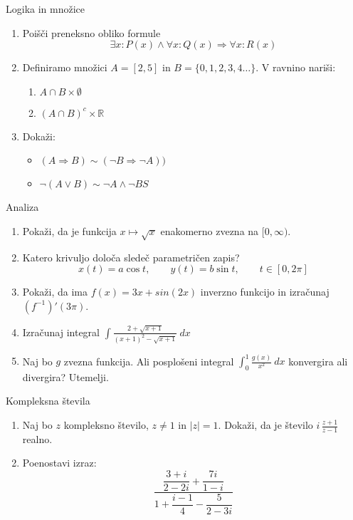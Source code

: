 \begin{frame}{Logika in množice}
	\begin{enumerate}
		\item
		Poišči preneksno obliko formule 
		$$\exists x : P(x) \wedge \forall x : Q(x) \Rightarrow \forall x : R(x)$$
		\item 
		Definiramo množici $A=[2,5]$ in $B=\{0,1,2,3,4\ldots\}$.
		V ravnino nariši:
		\begin{enumerate}
		   \item $A\cap B \times \emptyset$
		   \item $(A\cap B)^c \times \mathbb{R}$
		\end{enumerate}
		\item
		Dokaži:
		\begin{itemize}
			\item $(A\Rightarrow B)\sim(\neg B\Rightarrow \neg A))$
			\item $\neg(A \vee B)\sim \neg A \wedge \neg BS$
		\end{itemize}
	\end{enumerate}
\end{frame}

\begin{frame}{Analiza}
	\begin{enumerate}
		\item
		Pokaži, da je funkcija $x\mapsto \sqrt{x}$ enakomerno zvezna na $[0,\infty)$.
		\item 
		Katero krivuljo določa sledeč parametričen zapis?
		$$
		   x(t) = a \cos t, \qquad %
		   y(t) = b \sin t, \qquad %
		   t \in [0, 2 \pi]
		$$ 
		\item
		Pokaži, da ima $f(x)=3x + sin(2x)$ inverzno funkcijo 
		in izračunaj $(f^{-1})'(3\pi)$.
		
		\item
		Izračunaj integral 
		$\displaystyle \int\frac{2+\sqrt{x+1}}{(x+1)^2-\sqrt{x+1}} \ dx$
		\item 
		Naj bo $g$ zvezna funkcija. Ali posplošeni integral 
		$\int_{0}^{1}\frac{g(x)}{x^2} \ dx$
		konvergira ali divergira? Utemelji.
	\end{enumerate}
\end{frame}

\begin{frame}{Kompleksna števila}
	\begin{enumerate}
		\item
		Naj bo $z$ kompleksno število, $z \ne 1$ in $|z|=1$.
		Dokaži, da je število \( i \, \frac{z+1}{z-1} \) realno.
		\item
		Poenostavi izraz:
		\[\displaystyle \dfrac{\dfrac{3+i}{2-2i}+\dfrac{7i}{1-i}}{1+\dfrac{i-1}{4}-\dfrac{5}{2-3i}}\]
	\end{enumerate}
\end{frame}